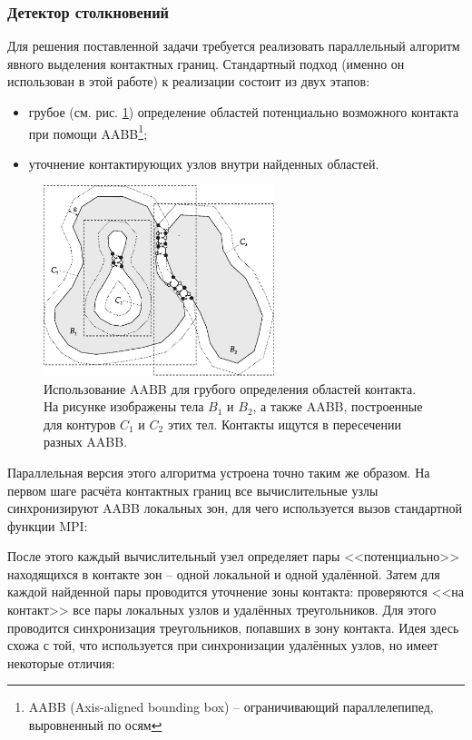 \subsubsection{Детектор столкновений}
Для решения поставленной задачи требуется реализовать параллельный алгоритм явного выделения контактных границ. Стандартный подход (именно он использован в этой работе) к реализации состоит из двух этапов:
\begin{itemize}
	\item грубое (см. рис. \ref{pic:collision_detection}) определение областей потенциально возможного контакта при помощи AABB\footnote{AABB (Axis-aligned bounding box) -- ограничивающий параллелепипед, выровненный по осям };
	\item уточнение контактирующих узлов внутри найденных областей.
\end{itemize}
\begin{figure}[htp]
\centering
\includegraphics[width=0.6\textwidth]{eps/collision_detection.eps}
\caption{Использование AABB для грубого определения областей контакта. На рисунке изображены тела $B_1$ и $B_2$, а также AABB, построенные для контуров $C_1$ и $C_2$ этих тел. Контакты ищутся в пересечении разных AABB.}
\label{pic:collision_detection}
\end{figure}
Параллельная версия этого алгоритма устроена точно таким же образом. На первом шаге расчёта контактных границ все вычислительные узлы синхронизируют AABB локальных зон, для чего используется вызов стандартной функции MPI:

После этого каждый вычислительный узел определяет пары <<потенциально>> находящихся в контакте зон -- одной локальной и одной удалённой. Затем для каждой найденной пары проводится уточнение зоны контакта: проверяются <<на контакт>> все пары локальных узлов и удалённых треугольников. Для этого проводится синхронизация треугольников, попавших в зону контакта. Идея здесь схожа с той, что используется при синхронизации удалённых узлов, но имеет некоторые отличия:
